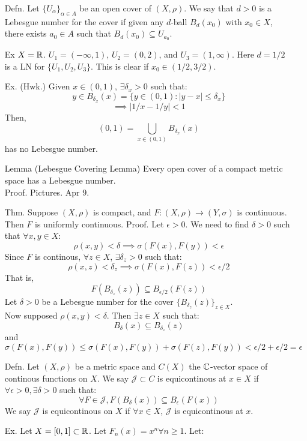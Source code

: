 \documentclass[12pt]{article}
\begin{document}


\begin{itemize}
    \item[Defn.] Let $\{U_\alpha\}_{\alpha \in A}$ be an open cover of $(X, \rho)$. We say that $d > 0$ is a Lebesgue number for the cover if given any $d$-ball $B_d(x_0)$ with $x_0 \in X$, there exists $a_0 \in A$ such that $B_d(x_0) \subseteq U_{a_0}$. 
    \item[Ex] $X = \mathbb R$. $U_1 = (-\infty, 1)$, $U_2 = (0, 2)$, and $U_3 = (1, \infty)$. Here $d = 1/2$ is a LN for $\{U_1, U_2, U_3\}$. This is clear if $x_0 \in (1/2, 3/2)$. 
    \item[Ex. (Hwk.)] Given $x \in (0, 1)$, $\exists \delta_x > 0$ such that:
    \[ y \in B_{\delta_x}(x) = \{y \in (0, 1): |y-x| \leq \delta_x\} \]
    \[ \implies |1/x - 1/y| < 1 \]
    Then, 
    \[ (0, 1) = \bigcup_{x \in (0, 1)} B_{\delta_x}(x) \]
    has no Lebesgue number.
    \item[Lemma] (Lebesgue Covering Lemma) Every open cover of a compact metric space has a Lebesgue number. \\ 
    Proof. Pictures. Apr 9.
    \item[Thm.] Suppose $(X, \rho)$ is compact, and $F: (X, \rho) \to (Y, \sigma)$ is continuous. Then $F$ is uniformly continuous.
    \bbni Proof. Let $\epsilon > 0$. We need to find $\delta > 0$ such that $\forall x, y \in X$: 
    \[ \rho(x, y) < \delta \implies \sigma(F(x), F(y)) < \epsilon \]
    Since $F$ is continous, $\forall z \in X$, $\exists \delta_z > 0$ such that:
    \[ \rho(x, z) < \delta_z \implies \sigma(F(x), F(z)) < \epsilon/2 \]
    That is, 
    \[ F(B_{\delta_z}(z)) \subseteq B_{\epsilon/2}(F(z)) \]
    Let $\delta > 0$ be a Lebesgue number for the cover $\{B_{\delta_z}(z)\}_{z \in X}$. \\
    Now supposed $\rho(x,y) < \delta$. Then $\exists z \in X$ such that:
    \[ B_\delta(x) \subseteq B_{\delta_z}(z) \]
    and 
    \[\sigma(F(x), F(y)) \leq \sigma(F(x), F(y)) + \sigma(F(z), F(y)) < \epsilon/2 + \epsilon/2 = \epsilon \]
    \item[Defn. ] Let $(X, \rho)$ be a metric space and $C(X)$ the $\mathbb C$-vector space of continous functions on $X$. We say $\mathcal{J} \subset C$ is equicontinous at $x \in X$ if $\forall \epsilon > 0, \exists \delta > 0$ such that:
    \[ \forall F \in \mathcal{J}, F(B_\delta(x)) \subseteq B_\epsilon(F(x)) \]
    We say $\mathcal{J}$ is equicontinous on $X$ if $\forall x \in X$, $\mathcal{J}$ is equicontinous at $x$.
    \item[Ex.] Let $X = [0, 1] \subset \mathbb R$. Let $F_n(x) = x^n \forall n \geq 1$. Let:

\end{itemize}
\end{document}

